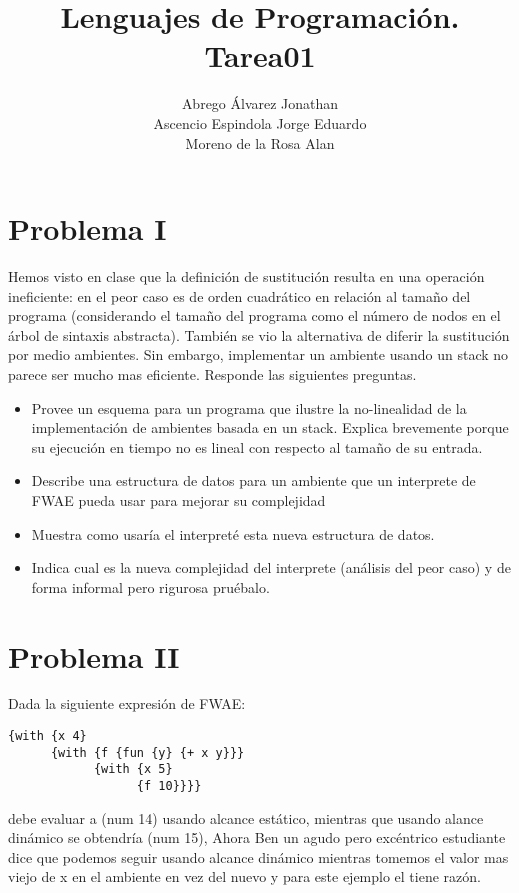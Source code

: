 \documentclass[a4paper]{article}
\title{Lenguajes de Programación. Tarea01}
\author{Abrego Álvarez Jonathan \\
Ascencio Espindola Jorge Eduardo \\
Moreno de la Rosa Alan}
\begin{document}
\maketitle

\section{Problema I}

Hemos visto en clase que la definición de sustitución resulta en una operación ineficiente: en el peor caso es de orden cuadrático en relación al tamaño del programa (considerando el tamaño del programa como el número de
nodos en el árbol de sintaxis abstracta). También se vio la alternativa de diferir la sustitución por medio ambientes. Sin embargo, implementar un ambiente usando un stack no parece ser mucho mas eficiente.
Responde las siguientes preguntas.

\begin{itemize}
\item Provee un esquema para un programa que ilustre la no-linealidad de la implementación de ambientes basada en un stack. Explica brevemente porque su ejecución en tiempo no es lineal con respecto al tamaño de su entrada.
\item Describe una estructura de datos para un ambiente que un interprete de FWAE pueda usar para mejorar su
complejidad
\item Muestra como usaría el interpreté esta nueva estructura de datos.
\item Indica cual es la nueva complejidad del interprete (análisis del peor caso) y de forma informal pero rigurosa pruébalo.
\end{itemize}


\section{Problema II}
Dada la siguiente expresión de FWAE: 

\begin{verbatim}
{with {x 4} 
      {with {f {fun {y} {+ x y}}} 
            {with {x 5}
                  {f 10}}}}
\end{verbatim}

debe evaluar a (num 14) usando alcance estático, mientras que usando alance dinámico se obtendría (num 15),
Ahora Ben un agudo pero excéntrico estudiante dice que podemos seguir usando alcance dinámico mientras tomemos
el valor mas viejo de x en el ambiente en vez del nuevo y para este ejemplo el tiene razón.
\end{document}
